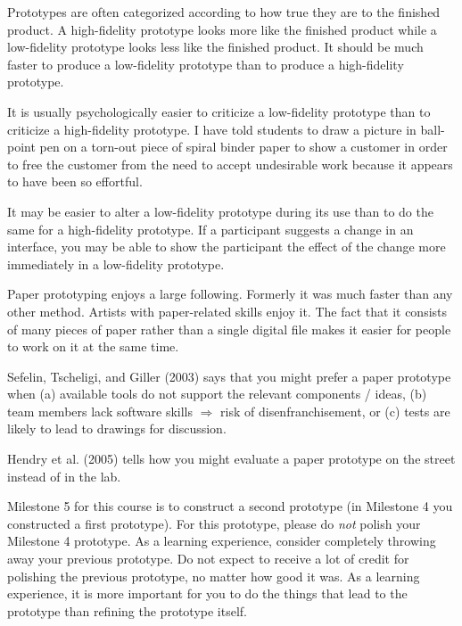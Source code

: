 Prototypes are often categorized according to how true they are to the
finished product. A high-fidelity prototype looks more like the finished
product while a low-fidelity prototype looks less like the finished
product. It should be much faster to produce a low-fidelity prototype
than to produce a high-fidelity prototype.

It is usually psychologically easier to criticize a low-fidelity
prototype than to criticize a high-fidelity prototype. I have told
students to draw a picture in ball-point pen on a torn-out piece of
spiral binder paper to show a customer in order to free the customer
from the need to accept undesirable work because it appears to have been
so effortful.

It may be easier to alter a low-fidelity prototype during its use than
to do the same for a high-fidelity prototype. If a participant suggests
a change in an interface, you may be able to show the participant the
effect of the change more immediately in a low-fidelity prototype.

\hypertarget{paper-prototyping}{%
\label{paper-prototyping}}

Paper prototyping enjoys a large following. Formerly it was much faster
than any other method. Artists with paper-related skills enjoy it. The
fact that it consists of many pieces of paper rather than a single
digital file makes it easier for people to work on it at the same time.

Sefelin, Tscheligi, and Giller (2003) says that you might prefer a paper
prototype when (a) available tools do not support the relevant
components / ideas, (b) team members lack software skills
\(\Rightarrow\) risk of disenfranchisement, or (c) tests are likely to
lead to drawings for discussion.

Hendry et al. (2005) tells how you might evaluate a paper prototype on
the street instead of in the lab.

\hypertarget{your-second-prototype}{%
\label{your-second-prototype}}

Milestone 5 for this course is to construct a second prototype (in
Milestone 4 you constructed a first prototype). For this prototype,
please do \emph{not} polish your Milestone 4 prototype. As a learning
experience, consider completely throwing away your previous prototype.
Do not expect to receive a lot of credit for polishing the previous
prototype, no matter how good it was. As a learning experience, it is
more important for you to do the things that lead to the prototype than
refining the prototype itself.

